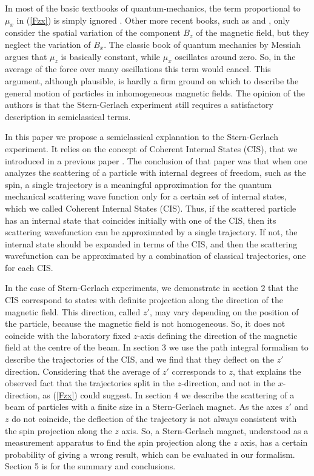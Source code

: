 \documentclass[aps,preprint,prl]{revtex4-2}
\begin{document}
In most of the basic textbooks of quantum-mechanics, the term proportional to
$\mu_x$ in (\ref{Fzx}) is simply ignored \cite{eis}.   Other more recent 
books, such as \cite{lev} and \cite{mer}, only consider the spatial variation
of the component $B_z$ of the magnetic field, but they neglect the variation
of $B_x$. The classic book of quantum mechanics
by Messiah \cite{mes} argues that  $\mu_z$ is basically
constant, while $\mu_x$ oscillates around zero. So, in the average of the force
over many oscillations this term would cancel. This argument, although 
plausible, is hardly a firm ground on which to describe the general motion of
particles in inhomogeneous magnetic fields.
The opinion of the authors is that the Stern-Gerlach experiment still requires
a satisfactory description in semiclassical terms. 

In this paper we propose a semiclassical explanation to the Stern-Gerlach 
experiment. It relies on the concept of Coherent Internal States (CIS), that we
introduced in a previous paper \cite{sara}. The conclusion of that paper 
was that when one analyzes the scattering of a particle with
internal degrees of freedom, such as the spin, a single  trajectory  is a
meaningful approximation for the quantum mechanical scattering wave function
only for a certain set of internal states, which we called Coherent Internal
States (CIS). Thus, if the scattered particle has an internal state that 
coincides initially with one of the CIS, then its scattering wavefunction
can be approximated by a single trajectory. If not, the internal state
should be expanded in terms of the CIS, and then the scattering wavefunction
can be approximated by a combination of classical trajectories, one for each 
CIS.

In the case of Stern-Gerlach experiments, we demonstrate in section 2
that the CIS correspond to  states with definite projection along the 
direction of the magnetic field. This direction, called $z'$, may vary
depending on the position of the particle, because the magnetic field is not
homogeneous. So, it does not coincide with the laboratory fixed $z$-axis 
defining the
direction of the magnetic field at the centre of the beam. 
In section 3 we  use the path integral
formalism to describe the trajectories of the CIS, and we find that
they deflect on the $z'$ direction. Considering that the average of $z'$
corresponds to $z$, 
that explains the observed fact that 
the trajectories split in the $z$-direction, and not in the $x$-direction,
as (\ref{Fzx}) could suggest.
In section 4 we describe the scattering of a beam of particles with a 
finite size in a Stern-Gerlach magnet. As the axes $z'$ and $z$ do not
coincide,  the deflection of the trajectory is not always consistent with 
the spin projection along the $z$ axis. So, a Stern-Gerlach magnet, understood
as a measurement apparatus to find the spin projection along the $z$ axis,
has a certain probability  of giving a wrong result, which can be evaluated 
in our formalism. 
Section 5 is for the summary and 
conclusions.
\end{document}
